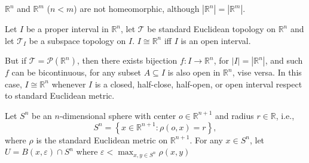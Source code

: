 \begin{example}
	$\mathbb R^n$ and $\mathbb R^m$ ($n < m$) are not homeomorphic, although $|\mathbb R^n| = |\mathbb R^m|$.
\end{example}


\begin{example}
	Let $I$ be a proper interval in $\mathbb R^n$, let $\mathcal T$ be standard Euclidean topology on $\mathbb R^n$ and let $\mathcal T_I$ be a subspace topology on $I$. $I \cong \mathbb R^n$ iff $I$ is an open interval.
	
	But if $\mathcal T = \mathcal P(\mathbb R^n)$, then there exists bijection $f: I \to \mathbb R^n$, for $|I| = |\mathbb R^n|$, and such $f$ can be bicontinuous, for any subset $A \subseteq I$ is also open in $\mathbb R^n$, vise versa. In this case, $I \cong \mathbb R^n$ whenever $I$ is a closed, half-close, half-open, or open interval respect to standard Euclidean metric.
\end{example}


\begin{example}
	Let $S^n$ be an $n$-dimensional sphere with center $o \in \mathbb R^{n + 1}$ and radius $r \in \mathbb R$, i.e.,
	$$
	S^n = \left\{ x \in \mathbb R^{n + 1} : \rho(o, x) = r \right\},
	$$
	where $\rho$ is the standard Euclidean metric on $\mathbb R^{n+1}$. For any $x \in S^n$, let $U = B(x, \varepsilon) \cap S^n$ where $\varepsilon < \max_{x,y \in S^n} \rho(x,y)$
\end{example}




































%